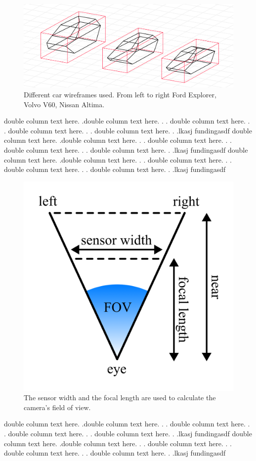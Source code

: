 \documentclass[conference]{IEEEtran}
\begin{document}
\begin{figure}
    \centering
    \includegraphics[width=0.7\columnwidth]{./images/wireframes.png}
    \caption{Different car wireframes used. From left to right Ford Explorer, Volvo V60, Nissan Altima.}
    \label{img:wireframes}
\end{figure}

double column text here. .double column text here. . .
double column text here. . .
double column text here. . .
double column text here. . .lkasj fundingasdf
double column text here. .double column text here. . .
double column text here. . .
double column text here. . .
double column text here. . .lkasj fundingasdf
double column text here. .double column text here. . .
double column text here. . .
double column text here. . .
double column text here. . .lkasj fundingasdf

\begin{figure}
    \centering
    \includegraphics[width=0.45\columnwidth]{./images/focal_lenght_and_field_of_view.png}
    \caption{The sensor width and the focal length are used to calculate the camera's field of view.}
    \label{img:fov}
\end{figure}

double column text here. .double column text here. . .
double column text here. . .
double column text here. . .
double column text here. . .lkasj fundingasdf
double column text here. .double column text here. . .
double column text here. . .
double column text here. . .
double column text here. . .lkasj fundingasdf
\end{document}
